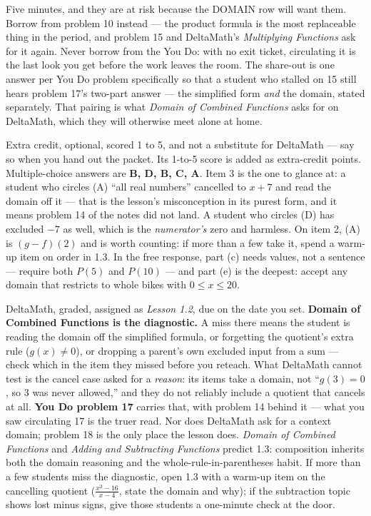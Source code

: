 \documentclass[10pt]{article}
\begin{document}
\begin{teachernote}[Debrief]
Five minutes, and they are at risk because the DOMAIN row will want them. Borrow
from problem 10 instead --- the product formula is the most replaceable thing in
the period, and problem 15 and DeltaMath's \textit{Multiplying Functions} ask for
it again. Never borrow from the You Do: with no exit ticket, circulating it is
the last look you get before the work leaves the room. The share-out is one
answer per You Do problem specifically so that a student who stalled on 15 still
hears problem 17's two-part answer --- the simplified form \emph{and} the domain,
stated separately. That pairing is what \textit{Domain of Combined Functions}
asks for on DeltaMath, which they will otherwise meet alone at home.
\end{teachernote}

\begin{teachernote}[AP Practice]
Extra credit, optional, scored 1 to 5, and not a substitute for DeltaMath --- say so when you
hand out the packet. Its 1-to-5 score is added as extra-credit points. Multiple-choice answers are
\textbf{B, D, B, C, A}. Item 3 is the one to glance at: a student who circles (A)
``all real numbers'' cancelled to $x + 7$ and read the domain off it --- that is
the lesson's misconception in its purest form, and it means problem 14 of the
notes did not land. A student who circles (D) has excluded $-7$ as well, which is
the \emph{numerator's} zero and harmless. On item 2, (A) is $(g-f)(2)$ and is
worth counting: if more than a few take it, spend a warm-up item on order in 1.3.
In the free response, part (c) needs values, not a sentence --- require both
$P(5)$ and $P(10)$ --- and part (e) is the deepest: accept any domain that
restricts to whole bikes with $0 \le x \le 20$.
\end{teachernote}

\begin{teachernote}[Homework]
DeltaMath, graded, assigned as \textit{Lesson 1.2}, due on the date you set.
\textbf{Domain of Combined Functions is the diagnostic.} A miss there means the
student is reading the domain off the simplified formula, or forgetting the
quotient's extra rule ($g(x) \ne 0$), or dropping a parent's own excluded input
from a sum --- check which in the item they missed before you reteach. What
DeltaMath cannot test is the cancel case asked for a \emph{reason}: its items
take a domain, not ``$g(3) = 0$, so 3 was never allowed,'' and they do not
reliably include a quotient that cancels at all. \textbf{You Do problem 17}
carries that, with problem 14 behind it --- what you saw circulating 17 is the
truer read. Nor does DeltaMath ask for a context domain; problem 18 is the only
place the lesson does. \textit{Domain of Combined Functions} and \textit{Adding
and Subtracting Functions} predict 1.3: composition inherits both the domain
reasoning and the whole-rule-in-parentheses habit. If more than a few students
miss the diagnostic, open 1.3 with a warm-up item on the cancelling quotient
($\frac{x^2-16}{x-4}$, state the domain and why); if the subtraction topic
shows lost minus signs, give those students a one-minute check at the door.
\end{teachernote}
\end{document}
